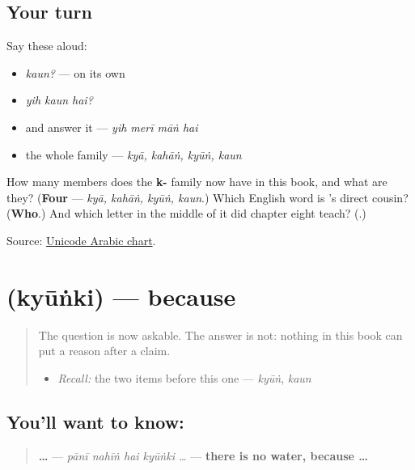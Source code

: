 \subsection*{Your turn}
Say these aloud:

\begin{itemize}
\raggedright
  \item \emph{kaun?} — on its own
  \item \emph{yih kaun hai?}
  \item and answer it — \emph{yih merī māṅ hai}
  \item the whole family — \emph{kyā, kahāṅ, kyūṅ, kaun}
\end{itemize}

\begin{tcolorbox}[breakable,colback=teal!4,colframe=teal!35!black,title={Before you move on}]
How many members does the \textbf{k-} family now have in this book, and what are they? (\textbf{Four} — \emph{kyā, kahāṅ, kyūṅ, kaun}.) Which English word is \textbf{}'s direct cousin? (\textbf{Who}.) And which letter in the middle of it did chapter eight teach? (\textbf{}.)

Source: \href{https://www.unicode.org/charts/PDF/U0600.pdf}{Unicode Arabic chart}.
\end{tcolorbox}
\section[\texorpdfstring{\ur{کیونکہ} (kyūṅki)}{کیونکہ (kyūṅki)}]{ (kyūṅki) — because}

\label{lesson:UR-C21-kyunki}



\begin{quote}
The question is now askable. The answer is not: nothing in this book can put a reason after a claim.

\begin{itemize}
\raggedright
  \item \emph{Recall:} the two items before this one — \emph{kyūṅ}, \emph{kaun}
\end{itemize}
\end{quote}

\subsection*{You'll want to know: }
\begin{quote}
\textbf{    …} — \emph{pānī nahīṅ hai kyūṅki …} — \textbf{there is no water, because …}
\end{quote}

